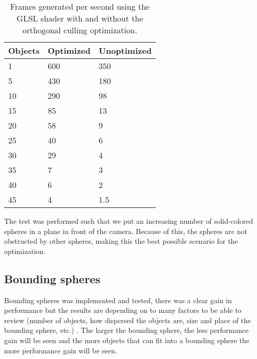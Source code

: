 			\begin{table}
			\centering
			\begin{tabular}{lll}
				\hline
				Objects & Optimized & Unoptimized \\ 
				\hline
				1       & 600       & 350         \\ 
				5       & 430       & 180         \\			
				10      & 290       & 98          \\
				15      & 85        & 13          \\
				20      & 58        & 9           \\
				25      & 40        & 6           \\
				30      & 29        & 4           \\
				35      & 7         & 3           \\
				40      & 6         & 2           \\
				45      & 4         & 1.5         \\
				\hline
			\end{tabular}
			\caption{Frames generated per second using the GLSL shader with and
				without the orthogonal culling optimization.}
			\end{table}


			The test was performed such that we put an increasing number of
			solid-colored spheres in a plane in front of the camera. Because of
			this, the spheres are not obstructed by other spheres, making this
			the best possible scenario for the optimization.

		\subsection{Bounding spheres}

			Bounding spheres was implemented and tested, there was a clear
			gain in performance but the results are depending on to many 
			factors to be able to review (number of objects, how dispersed the objects are, 
			size and place of the bounding sphere, etc.) . The larger the bounding sphere, the 
			less performance gain will be seen and the more objects that can 
			fit into a bounding sphere the more performance gain will be seen. 
